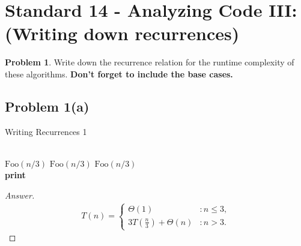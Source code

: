 \documentclass[11pt]{article}
\theoremstyle{definition}
\theoremstyle{definition}
\newtheorem{required}{Problem}
\theoremstyle{definition}
\begin{document}
\newpage
\section{Standard 14 - Analyzing Code III: (Writing down recurrences)}

\begin{required} \label{Recursive1}
Write down the recurrence relation for the runtime complexity of these algorithms. \textbf{Don't forget to include the base cases.}

\subsection{Problem 1(a)}

\begin{algorithm}
\caption{Writing Recurrences 1}\label{alg:Recurrence1}
\begin{algorithmic}[1]
\Return
\EndIf

\noindent \\
\State $\text{Foo}(n/3)$
\State $\text{Foo}(n/3)$
\State $\text{Foo}(n/3)$ \\

	\State \textbf{print} 
\EndFor
\EndProcedure
\end{algorithmic}
\end{algorithm}

\begin{proof}[Answer]
\begin{align*}
T(n) = \begin{cases}
\Theta(1) & : n \leq 3, \\
3T(\frac{n}{3}) + \Theta(n) & : n > 3.
\end{cases}
\end{align*}

\end{proof}

\end{required}
\end{document}
